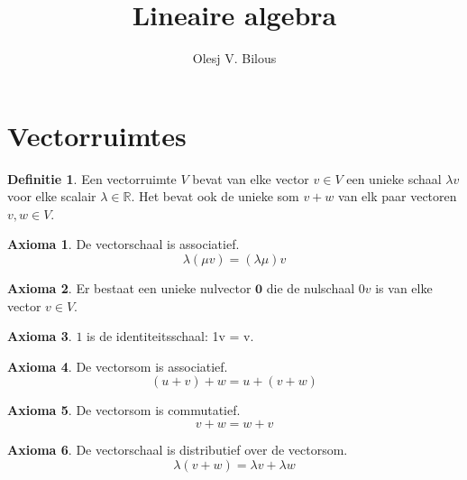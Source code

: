 \documentclass{amsart}
\theoremstyle{definition}
\newtheorem{axm}{Axioma}[section]
\newtheorem{dfn}{Definitie}[section]
\newcommand{\realnums}{\mathbb{R}}
\newcommand{\zerovec}{\mathbf{0}}
\begin{document}
\title{Lineaire algebra}
\author{Olesj V. Bilous}
\maketitle

\section{Vectorruimtes}

\begin{dfn}
	Een vectorruimte $V$ bevat van elke vector $v \in V$ een unieke schaal $\lambda v$ voor elke scalair $\lambda \in \realnums$. Het bevat ook de unieke som $v + w$ van elk paar vectoren $v, w \in V$.
\end{dfn}

\begin{axm}
	De vectorschaal is associatief.
	\begin{equation*}
		\lambda (\mu v) = (\lambda\mu)v
	\end{equation*}
\end{axm}

\begin{axm}
	Er bestaat een unieke nulvector $\zerovec$ die de nulschaal $0v$ is van elke vector $v \in V$.
\end{axm}

\begin{axm}
	$1$ is de identiteitsschaal: 1v = v.
\end{axm}

\begin{axm}
	De vectorsom is associatief.
	\begin{equation*}
		(u + v) + w = u + (v + w)
	\end{equation*}
\end{axm}

\begin{axm}
	De vectorsom is commutatief.
	\begin{equation*}
		v + w = w + v
	\end{equation*}
\end{axm}

\begin{axm}
	De vectorschaal is distributief over de vectorsom.
	\begin{equation*}
		\lambda(v + w) = \lambda v + \lambda w
	\end{equation*}
\end{axm}
\end{document}
